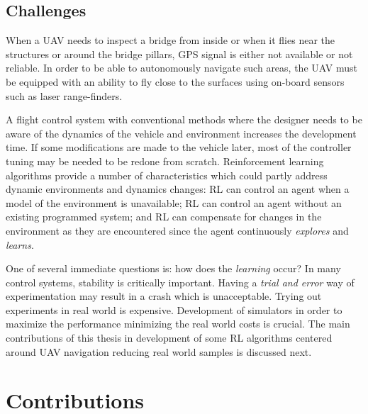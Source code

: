 \documentclass[12pt]{report}
\begin{document}
\subsection{Challenges}
When a UAV needs to inspect a bridge from inside or when it flies near the structures or around the bridge pillars, GPS signal is either not available or not reliable. In order to be able to autonomously navigate such areas, the UAV must be equipped with an ability to fly close to the surfaces using on-board sensors such as laser range-finders.\par
A flight control system with conventional methods where the designer needs to be aware of the dynamics of the vehicle and environment increases the development time. If some modifications are made to the vehicle later, most of the controller tuning may be needed to be redone from scratch. Reinforcement learning algorithms provide a number of characteristics which
could partly address dynamic environments and dynamics changes: RL can control
an agent when a model of the environment is unavailable; RL can control an agent without an
existing programmed system; and RL can compensate for changes in the environment
as they are encountered since the agent continuously \textit{explores} and \textit{learns}.

One of several immediate questions is: how does the \textit{learning} occur? In many control systems, stability is critically important. Having a \textit{trial and error} way of experimentation may result in a crash which is unacceptable. Trying out experiments in real world is expensive. Development of simulators in order to maximize the performance minimizing the real world costs is crucial. The main contributions of this thesis in development of some RL algorithms centered around UAV navigation reducing real world samples is discussed next.

\section{Contributions}
\end{document}
